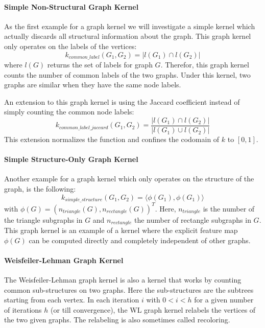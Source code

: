 \paragraph{Simple Non-Structural Graph Kernel}
As the first example for a graph kernel we will investigate a simple kernel which actually discards all structural information about the graph. This graph kernel only operates on the labels of the vertices:
\begin{equation*}
k_{common\_label}(G_1, G_2) = | l(G_1) \cap l(G_2) |
\end{equation*}
where $l(G)$ returns the set of labels for graph $G$.
Therefor, this graph kernel counts the number of common labels of the two graphs. Under this kernel, two graphs are similar when they have the same node labels.

An extension to this graph kernel is using the Jaccard coefficient instead of simply counting the common node labels:
\begin{equation*}
k_{common\_label\_jaccard}(G_1, G_2) = \frac{| l(G_1) \cap l(G_2) |}{| l(G_1) \cup l(G_2) |}
\end{equation*}
This extension normalizes the function and confines the codomain of $k$ to $[0, 1]$.

\paragraph{Simple Structure-Only Graph Kernel}
Another example for a graph kernel which only operates on the structure of the graph, is the following:
\begin{equation*}
k_{simple\_structure}(G_1, G_2) = \langle \phi(G_1), \phi(G_1) \rangle
\end{equation*}
with $\phi(G) = (n_{triangle}(G), n_{rectangle}(G))^T$. Here, $n_{triangle}$ is the number of the triangle subgraphs in $G$ and $n_{rectangle}$ the number of rectangle subgraphs in $G$.
This graph kernel is an example of a kernel where the explicit feature map $\phi(G)$ can be computed directly and completely independent of other graphs.


\paragraph{Weisfeiler-Lehman Graph Kernel}
The Weisfeiler-Lehman graph kernel is also a kernel that works by counting common sub-structures on two graphs.
Here the sub-structures are the subtrees starting from each vertex.
In each iteration $i$ with $0 < i < h$ for a given number of iterations $h$ (or till convergence), the WL graph kernel relabels the vertices of the two given graphs. The relabeling is also sometimes called recoloring.

